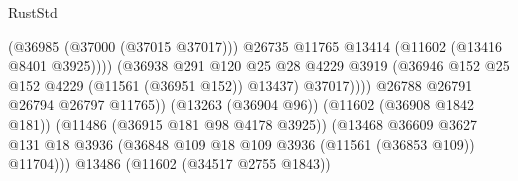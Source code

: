 \begin{lexlean}{RustStd}
\begin{coremodule}
                                                          (@36985 (@37000 (@37015 @37017)))
                                                          @26735
                                                          @11765
                                                          @13414
                                                          (@11602 (@13416 @8401 @3925))))
                                                      (@36938
                                                        @291
                                                        @120
                                                        @25
                                                        @28
                                                        @4229
                                                        @3919
                                                        (@36946
                                                          @152
                                                          @25
                                                          @152
                                                          @4229
                                                          (@11561 (@36951 @152))
                                                          @13437)
                                                        @37017))))
                                                @26788
                                                @26791
                                                @26794
                                                @26797
                                                @11765))
                                            (@13263 (@36904 @96))
                                            (@11602 (@36908 @1842 @181))
                                            (@11486 (@36915 @181 @98 @4178 @3925))
                                            (@13468
                                              @36609
                                              @3627
                                              @131
                                              @18
                                              @3936
                                              (@36848
                                                @109
                                                @18
                                                @109
                                                @3936
                                                (@11561 (@36853 @109))
                                                @11704)))
                                          @13486
                                          (@11602 (@34517 @2755 @1843))

\end{coremodule}
\end{lexlean}
